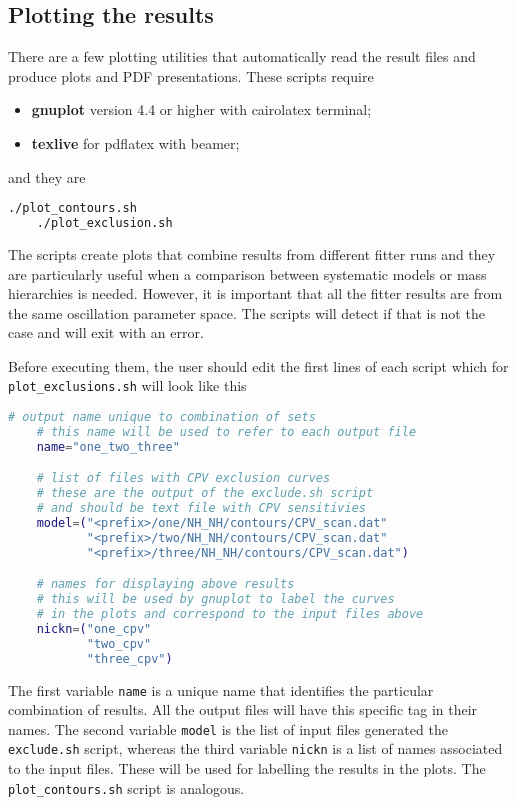 \documentclass[a4paper, 11pt]{article}
\begin{document}
\subsection{Plotting the results}
\label{sec:plot}

There are a few plotting utilities that automatically read the result files %
and produce plots and PDF presentations.
These scripts require
\begin{itemize}
		\small
	\item \textbf{gnuplot} version 4.4 or higher with cairolatex terminal;
	\item \textbf{texlive} for pdflatex with beamer;
\end{itemize}
and they are
\begin{lstlisting}[language=bash]
	./plot_contours.sh
	./plot_exclusion.sh
\end{lstlisting}
The scripts create plots that combine results from different fitter runs and they are particularly useful %
when a comparison between systematic models or mass hierarchies is needed.
However, it is important that all the fitter results are from the same oscillation parameter space.
The scripts will detect if that is not the case and will exit with an error.

Before executing them, the user should edit the first lines of each script which for %
\texttt{plot\_exclusions.sh} will look like this %

\begin{lstlisting}[language=bash]
	# output name unique to combination of sets
	# this name will be used to refer to each output file
	name="one_two_three"

	# list of files with CPV exclusion curves
	# these are the output of the exclude.sh script
	# and should be text file with CPV sensitivies
	model=("<prefix>/one/NH_NH/contours/CPV_scan.dat"
	       "<prefix>/two/NH_NH/contours/CPV_scan.dat"
	       "<prefix>/three/NH_NH/contours/CPV_scan.dat")

	# names for displaying above results
	# this will be used by gnuplot to label the curves
	# in the plots and correspond to the input files above
	nickn=("one_cpv"
	       "two_cpv"
	       "three_cpv")
\end{lstlisting}
The first variable \texttt{name} is a unique name that identifies the particular combination of results.
All the output files will have this specific tag in their names.
The second variable \texttt{model} is the list of input files generated the \texttt{exclude.sh} script, %
whereas the third variable \texttt{nickn} is a list of names associated to the input files.
These will be used for labelling the results in the plots.
The \texttt{plot\_contours.sh} script is analogous.
\end{document}
